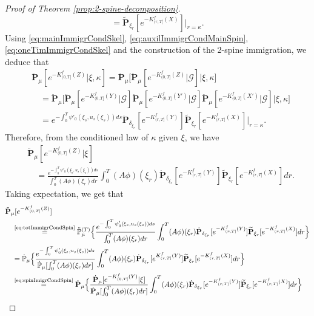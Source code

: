 \documentclass[UTF8]{pkuthss}
\theoremstyle{plain}
\theoremstyle{definition}
\numberwithin{equation}{section}
\begin{document}
\begin{proof}[Proof of Theorem \ref{prop:2-spine-decomposition}]
\begin{equation}
	= \widetilde{\mathbf P}_{\xi_r}[e^{-K^f_{(r, T]}(X)}]|_{r=\kappa}.
\end{equation}
	Using \eqref{eq:mainImmigrCondSkel}, \eqref{eq:auxilImmigrCondMainSpin}, \eqref{eq:oneTimImmigrCondSkel} and the construction of the 2-spine immigration, we deduce that
\[\begin{split}
	&\ddot {\mathbf P}_\mu[e^{-K^f_{(0, T]}(Z)}|\xi,\kappa]
	=\ddot {\mathbf P}_\mu\big[ \ddot {\mathbf P}_\mu[e^{-K^f_{(0, T]}(Z)}|\mathscr G ] \big | \xi,\kappa\big]\\
	&\quad=\ddot {\mathbf P}_\mu\Big[ \ddot {\mathbf P}_\mu[e^{-K^f_{(0, T]}(Y)}|\mathscr G ] \ddot {\mathbf P}_\mu[e^{-K^f_{(0, T]}(Y')}|\mathscr G ] \ddot {\mathbf P}_\mu[e^{-K^f_{(0, T]}(X')}|\mathscr G ] \Big | \xi,\kappa\Big]\\
	&\quad=e^{-\int_0^T\psi'_0(\xi_s,u_s(\xi_s))ds}\dot {\mathbf P}_{\delta_{\xi_r}}[ e^{-K^f_{(r, T]}(Y)}]\widetilde{\mathbf P}_{\xi_r}[e^{-K^f_{(r, T]}(X)}]\big |_{r=\kappa}.
\end{split}\]
	Therefore, from the conditioned law of $\kappa$ given $\xi$, we have
\begin{equation}\label{eq:totImmigrCondSpin}\begin{split}
	&\ddot {\mathbf P}_\mu[e^{-K^f_{(0, T]}(Z)}|\xi]\\
	&\quad = \frac{e^{-\int_0^T\psi'_0(\xi_s,u_s(\xi_s))ds}}{\int_0^T (A\phi)(\xi_r)dr}\int_0^T  (A\phi)(\xi_r)\dot {\mathbf P}_{\delta_{\xi_r}}[ e^{-K^f_{(r, T]}(Y)}]\widetilde{\mathbf P}_{\xi_r}[e^{-K^f_{(r, T]}(X)}] dr.
\end{split}\end{equation}
	Taking expectation, we get that
\[\begin{split}
	&\ddot {\mathbf P}_\mu[e^{-K^f_{(0,T]}(Z)}]\\
	&\quad \overset{\text{\eqref{eq:totImmigrCondSpin}}}{=}\ddot {\mathbb P}_{\mu}^{(T)}\Big\{ \frac{e^{-\int_0^T\psi'_0(\xi_s,u_s(\xi_s))ds}}{\int_0^T (A\phi)(\xi_r)dr}\int_0^T  (A\phi)(\xi_r)\dot {\mathbf P}_{\delta_{\xi_r}}[ e^{-K^f_{(r, T]}(Y)}]\widetilde{\mathbf P}_{\xi_r}[e^{-K^f_{(r, T]}(X)}] dr\Big\}\\
	&\quad= \dot{\mathbb P}_{\mu}
	\Big\{ \frac{e^{-\int_0^T\psi'_0(\xi_s,u_s(\xi_s))ds}}{\dot{\mathbb P}_{\mu}[\int_0^T (A\phi)(\xi_r)dr]}\int_0^T  (A\phi)(\xi_r)\dot {\mathbf P}_{\delta_{\xi_r}}[ e^{K^f_{(r, T]}(Y)}]\widetilde{\mathbf P}_{\xi_r}[e^{-K^f_{(r, T]}(X)}] dr\Big\}\\
	&\quad \overset{\text{\eqref{eq:spinImigrCondSpin}}}{=} \dot{\mathbf P}_{\mu}\Big\{ \frac{\dot {\mathbf P}_\mu[e^{-K^f_{(0,T]}(Y)}|\xi]}{\dot{\mathbf P}_{\mu}[\int_0^T (A\phi)(\xi_r)dr]}\int_0^T  (A\phi)(\xi_r)\dot {\mathbf P}_{\delta_{\xi_r}}[ e^{-K^f_{(r, T]}(Y)}]\widetilde{\mathbf P}_{\xi_r}[e^{-K^f_{(r, T]}(X)}] dr\Big\}\\

\end{split}\]
\end{proof}
\end{document}
